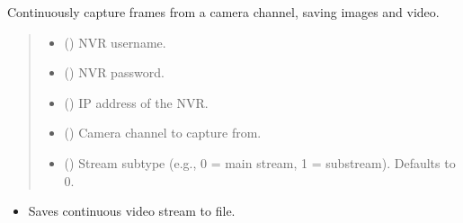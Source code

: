 \documentclass[letterpaper,10pt,english]{sphinxmanual}
\begin{document}
\begin{fulllineitems}
\label{\detokenize{modules/src.data_intake.data_intake.NVRConnection:src.data_intake.data_intake.NVRConnection.capture_camera}}
\pysigstartsignatures
\pysiglinewithargsret
{}
{\sphinxparamcomma {}\sphinxparamcomma {}\sphinxparamcomma {}\sphinxparamcomma {}}
{}
\pysigstopsignatures
\sphinxAtStartPar
Continuously capture frames from a camera channel, saving images and video.
\begin{quote}\begin{description}
\begin{itemize}
\item {} 
\sphinxAtStartPar
{} () \textendash{} NVR username.

\item {} 
\sphinxAtStartPar
{} () \textendash{} NVR password.

\item {} 
\sphinxAtStartPar
{} () \textendash{} IP address of the NVR.

\item {} 
\sphinxAtStartPar
{} () \textendash{} Camera channel to capture from.

\item {} 
\sphinxAtStartPar
{} (\sphinxstyleliteralemphasis{\sphinxupquote{, }}) \textendash{} Stream subtype (e.g., 0 = main stream, 1 = substream).
Defaults to 0.

\end{itemize}

\end{description}\end{quote}
\begin{description}
\begin{itemize}
\item {} 
\sphinxAtStartPar
Saves continuous video stream to  file.


\end{itemize}
\end{description}
\end{fulllineitems}
\end{document}
